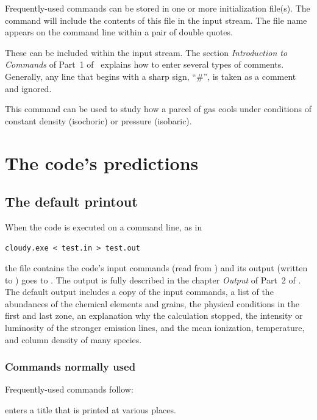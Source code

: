 \documentclass[12pt,twoside]{article}
\begin{document}
 Frequently-used commands
can be stored in one or more initialization file(s).
The  command will include the
contents of this file in the input stream.
The file name appears on the command line within a pair of double quotes.

 These can be included
within the input stream.
The section \emph{Introduction to Commands} of Part~1
of \Hazy\ explains how to enter several types of comments.
Generally, any line that begins with a sharp sign, ``\#'',
is taken as a comment and ignored.

This command can be used to study how a parcel of gas cools
under conditions of constant density (isochoric) or pressure
(isobaric).

\section{The code's predictions}
\label{sec:TheCodesPredictions}

\subsection{The default printout}

When the code is executed on a command line, as in
\small
\begin{verbatim}
cloudy.exe < test.in > test.out
\end{verbatim}
\normalsize
the file  contains the code's
input commands (read from ) and
its output (written to ) goes
to .
The output is fully
described in the chapter \emph{Output} of Part~2 of \Hazy.
The default output
includes a copy of the input commands, a list of the abundances of the
chemical elements and grains, the physical conditions in the first and last
zone, an explanation why the calculation stopped, the intensity or luminosity
of the stronger emission lines, and the mean ionization, temperature, and
column density of many species.

\subsubsection{Commands normally used}

Frequently-used commands follow:

 enters a title that is printed at various places.
\end{document}
